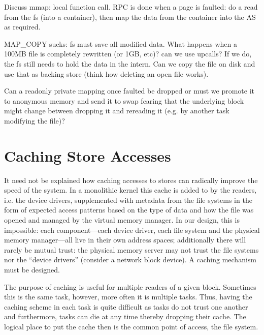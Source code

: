 Discuss mmap: local function call.  RPC is done when a page is
faulted: do a read from the fs (into a container), then map the data
from the container into the AS as required.

MAP\_COPY sucks: fs must save all modified data.  What happens when a
100MB file is completely rewritten (or 1GB, etc)?  can we use upcalls?
If we do, the fs still needs to hold the data in the intern.  Can we
copy the file on disk and use that as backing store (think how
deleting an open file works).

Can a readonly private mapping once faulted be dropped or must we
promote it to anonymous memory and send it to swap fearing that the
underlying block might change between dropping it and rereading it
(e.g. by another task modifying the file)?

\section{Caching Store Accesses}

It need not be explained how caching accesses to stores can radically
improve the speed of the system.  In a monolithic kernel this cache is
added to by the readers, i.e. the device drivers, supplemented with
metadata from the file systems in the form of expected access patterns
based on the type of data and how the file was opened and managed by
the virtual memory manager.  In our design, this is impossible: each
component---each device driver, each file system and the physical
memory manager---all live in their own address spaces; additionally
there will rarely be mutual trust: the physical memory server may not
trust the file systems nor the ``device drivers'' (consider a network
block device).  A caching mechanism must be designed.

The purpose of caching is useful for multiple readers of a given
block.  Sometimes this is the same task, however, more often it is
multiple tasks.  Thus, having the caching scheme in each task is quite
difficult as tasks do not trust one another and furthermore, tasks can
die at any time thereby dropping their cache.  The logical place to
put the cache then is the common point of access, the file system.

